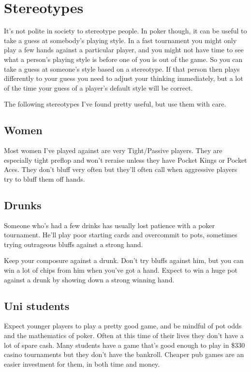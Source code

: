 \chapter{Stereotypes}


It's not polite in society to stereotype people. In poker though,
it can be useful to take a guess at somebody's playing style.
In a fast tournament you might only play a few hands against
a particular player, and you might not have time to see
what a person's playing style is before one of you is out
of the game. So you can take a guess at someone's style based
on a stereotype. If that person then plays differently to your guess 
you need to adjust your thinking immediately, but a lot of the
time your guess of a player's default style will be correct.

The following stereotypes I've found pretty useful, but use them
with care. 

\section{Women}

Most women I've played against are very Tight/Passive players. They
are especially tight preflop and won't reraise unless they have
Pocket Kings or Pocket Aces. They don't bluff very often but they'll
often call when aggressive players try to bluff them off hands.

\section{Drunks}

Someone who's had a few drinks has usually lost patience with a poker
tournament.  He'll play poor starting cards and overcommit to pots, sometimes
trying outrageous bluffs against a strong hand.

Keep your composure against a drunk. Don't try bluffs against him, but you
can win a lot of chips from him when you've got a hand. Expect to win
a huge pot against a drunk by showing down a strong winning hand.

\section{Uni students}

Expect younger players to play a pretty good game, and be mindful of pot
odds and the mathematics of poker. Often at this time of their lives
they don't have a lot of spare cash. Many students have a game that's
good enough to play in \$330 casino tournaments but they don't have
the bankroll. Cheaper pub games are an easier investment for them,
in both time and money.


